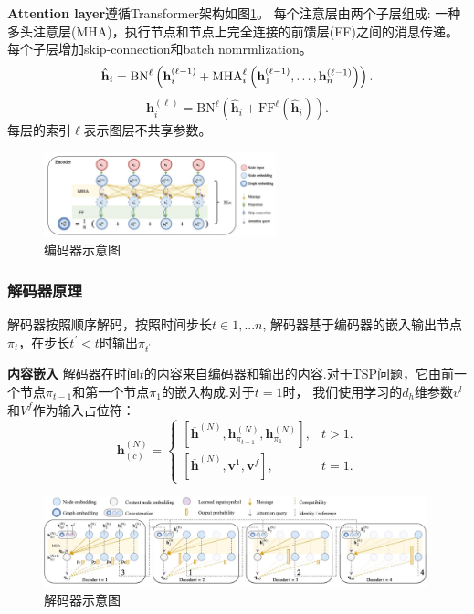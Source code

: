\documentclass{whutmod}
\begin{document}
\textbf{Attention layer}\quad 遵循Transformer架构如图\ref{fig:encoder}。 每个注意层由两个子层组成: 一种多头注意层(MHA)，执行节点和节点上完全连接的前馈层(FF)之间的消息传递。每个子层增加skip-connection和batch nomrmlization。
\begin{equation}
\hat{\mathbf{h}}_{i} =\mathrm{B} \mathrm{N}^{\ell}\left(\mathbf{h}_{i}^{(\ell-1)}+\mathrm{MHA}_{i}^{\ell}\left(\mathbf{h}_{1}^{(\ell-1)}, \ldots, \mathbf{h}_{n}^{(\ell-1)}\right)\right). \\
\end{equation}
\begin{equation}
\mathbf{h}_{i}^{(\ell)} =\mathrm{B} \mathrm{N}^{\ell}\left(\hat{\mathbf{h}}_{i}+\mathrm{FF}^{\ell}\left(\hat{\mathbf{h}}_{i}\right)\right).
\end{equation}
每层的索引$\ell$表示图层不共享参数。
\begin{figure}[!h]
	\centering
	\includegraphics[width=0.6\textwidth]{encoder.jpg}
	\caption{编码器示意图}
	\label{fig:encoder}
\end{figure}

\subsubsection{解码器原理}
解码器按照顺序解码，按照时间步长$t\in {1,...n}$, 解码器基于编码器的嵌入输出节点$\pi_{t}$，在步长$t^{\prime}<t$时输出$\pi_{t^{\prime}}$

\textbf{内容嵌入}\quad
解码器在时间$t$的内容来自编码器和输出的内容.对于TSP问题，它由前一个节点$\pi_{t-1}$和第一个节点$\pi_{1}$的嵌入构成.对于$t=1$时， 我们使用学习的$d_{h}$维参数$v^{l}$和$V^{f}$作为输入占位符：
\begin{equation}
	\mathbf{h}_{(c)}^{(N)}=\left\{\begin{array}{ll}
{\left[\overline{\mathbf{h}}^{(N)}, \mathbf{h}_{\pi_{t-1}}^{(N)}, \mathbf{h}_{\pi_{1}}^{(N)}\right]}, & t>1. \\
{\left[\overline{\mathbf{h}}^{(N)}, \mathbf{v}^{1}, \mathbf{v}^{f}\right]}, & t=1.
\end{array}\right.\end{equation}

\begin{figure}[!h]
	\centering
	\includegraphics[width=0.99\textwidth]{decoder.jpg}
	\caption{解码器示意图}
	\label{fig:decoder}
\end{figure}
\end{document}
